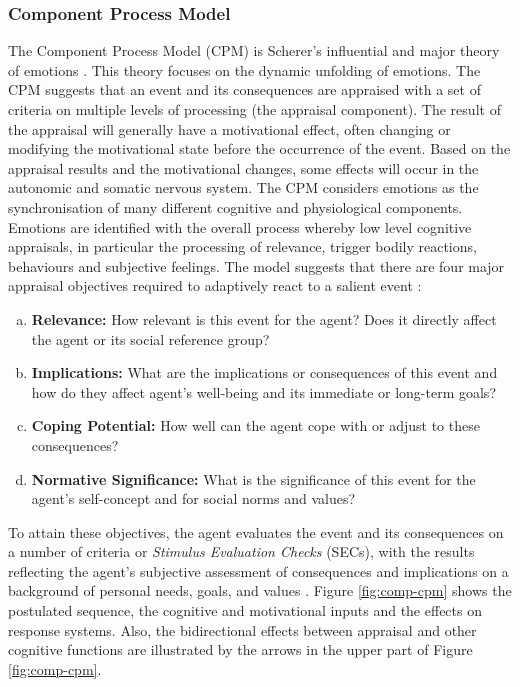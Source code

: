\documentclass[12pt]{report}
\begin{document}
\subsubsection{Component Process Model}
\label{sec:cpm}

The Component Process Model (CPM) is Scherer's influential and major theory of
emotions
\cite{scherer:sequential-appraisal-process,scherer:appraisal-processes}. This
theory focuses on the dynamic unfolding of emotions. The CPM suggests that an
event and its consequences are appraised with a set of criteria on multiple
levels of processing (the appraisal component). The result of the appraisal will
generally have a motivational effect, often changing or modifying the
motivational state before the occurrence of the event. Based on the appraisal
results and the motivational changes, some effects will occur in the autonomic
and somatic nervous system. The CPM considers emotions as the synchronisation of
many different cognitive and physiological components. Emotions are identified
with the overall process whereby low level cognitive appraisals, in particular
the processing of relevance, trigger bodily reactions, behaviours and subjective
feelings. The model suggests that there are four major appraisal objectives
required to adaptively react to a salient event
\cite{scherer:dynamic-architecture-emotion}:

\begin{enumerate}[a)]
  \item \textbf{Relevance:} How relevant is this event for the agent? Does it
  directly affect the agent or its social reference group?
  \item \textbf{Implications:} What are the implications or consequences of this
  event and how do they affect agent's well-being and its immediate or long-term
  goals?
  \item \textbf{Coping Potential:} How well can the agent cope with or adjust to
  these consequences?
  \item \textbf{Normative Significance:} What is the significance of this event
  for the agent's self-concept and for social norms and values?
\end{enumerate}

To attain these objectives, the agent evaluates the event and its consequences
on a number of criteria or \textit{Stimulus Evaluation Checks} (SECs), with the
results reflecting the agent’s subjective assessment of consequences and
implications on a background of personal needs, goals, and values
\cite{scherer:appraisal-processes}. Figure \ref{fig:comp-cpm} shows the
postulated sequence, the cognitive and motivational inputs and the effects on
response systems. Also, the bidirectional effects between appraisal and other
cognitive functions are illustrated by the arrows in the upper part of Figure
\ref{fig:comp-cpm}.
\end{document}
